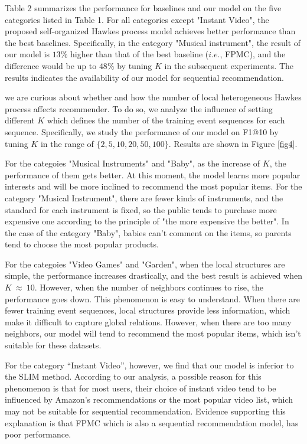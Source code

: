 \documentclass[runningheads]{llncs}
\begin{document}
Table 2 summarizes the performance for baselines and our model on the five categories listed in Table 1. For all categories except "Instant Video", the proposed self-organized Hawkes process model achieves better performance than the best baselines. 
Specifically, in the category "Musical instrument", the result of our model is $13\%$ higher than that of the best baseline ($i.e.$, FPMC), and the difference would be up to $48\%$ by tuning $K$ in the subsequent experiments. The results indicates the availability of our model for sequential recommendation.

we are curious about whether and how the number of local heterogeneous Hawkes process affects recommender.
To do so, we analyze the influence of setting different $K$ which defines the number of the training event sequences for each sequence.
Specifically, we study the performance of our model on F1@10
by tuning $K$ in the range of $\{2,5,10,20,50,100\}$. Results are
shown in Figure \ref{fig4}. 

For the categoies "Musical Instruments" and "Baby", as the increase of $K$, the performance of them gets better. At this moment, the model learns more popular interests and will be more inclined to recommend the most popular items. For the category "Musical Instrument", there are fewer kinds of instruments, and the standard for each instrument is fixed, so the public tends to purchase more expensive one according to the principle of "the more expensive the better". In the case of the category "Baby", babies can't comment on the items, so parents tend to choose the most popular products.

For the categoies "Video Games" and "Garden", when the local structures are simple, the performance increases drastically, and the best result is achieved when $K \  \approx \ 10 $. However, when the number of neighbors continues to rise, the performance goes down. This phenomenon is easy to understand. When there are fewer training event sequences, local structures provide less information, which make it difficult to capture global relations. However, when there are too many neighbors, our model will tend to recommend the most popular items, which isn't suitable for these datasets.

For the category “Instant Video”, however, we find that our model is inferior to the SLIM method. According to our analysis, a possible reason for this phenomenon is that for most users, their choice of instant video tend to be influenced by Amazon's recommendations or the most popular video list, which may not be suitable for sequential recommendation. Evidence supporting this explanation is that FPMC which is also a sequential recommendation model, has poor performance.
\end{document}
